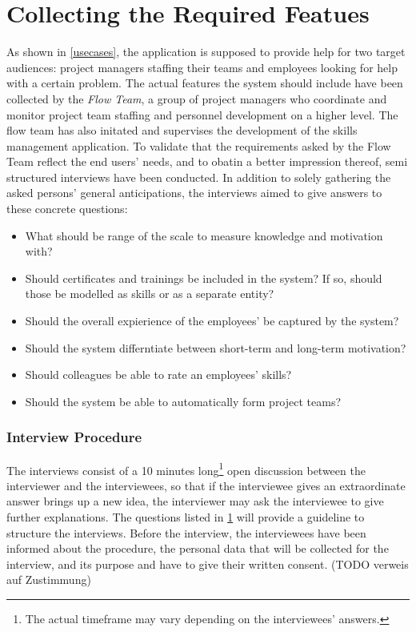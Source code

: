 \section{Collecting the Required Featues}
\label{interviewquestions}
As shown in \ref{usecases}, the application is supposed to provide help for two target audiences: project managers staffing their teams and employees looking for help with a certain problem.
The actual features the system should include have been collected by the \textit{Flow Team}, a group of project managers who coordinate and monitor project team staffing and personnel development on a higher level. The flow team has also initated and supervises the development of the skills management application. To validate that the requirements asked by the Flow Team reflect the end users' needs, and to obatin a better impression thereof, semi structured interviews have been conducted. In addition to solely gathering the asked persons' general anticipations, the interviews aimed to give answers to these concrete questions:
\begin{itemize}
	\item What should be range of the scale to measure knowledge and motivation with?
	\item Should certificates and trainings be included in the system? If so, should those be modelled as skills or as a separate entity?
	\item Should the overall expierience of the employees' be captured by the system?
	\item Should the system differntiate between short-term and long-term motivation?
	\item Should colleagues be able to rate an employees' skills?
	\item Should the system be able to automatically form project teams?
\end{itemize}

\subsubsection{Interview Procedure}
The interviews consist of a 10 minutes long\footnote{The actual timeframe may vary depending on the interviewees' answers.} open discussion between the interviewer and the interviewees, so that if the interviewee gives an extraordinate answer brings up a new idea, the interviewer may ask the interviewee to give further explanations. The questions listed in \ref{interviewquestions} will provide a guideline to structure the interviews. Before the interview, the interviewees have been informed about the procedure, the personal data that will be collected for the interview, and its purpose and have to give their written consent. (TODO verweis auf Zustimmung)

